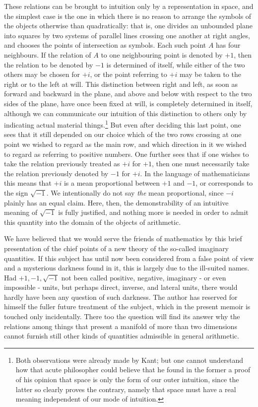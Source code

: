 \documentclass[12pt]{article}
\begin{document}
These relations can be brought to intuition only by a representation in space, and the simplest case is the one in which there is no reason to arrange the symbols of the objects otherwise than quadratically: that is, one divides an unbounded plane into squares by two systems of parallel lines crossing one another at right angles, and chooses the points of intersection as symbols. Each such point $A$ has four neighbours. If the relation of $A$ to one neighbouring point is denoted by $+1$, then the relation to be denoted by $-1$ is determined of itself, while either of the two others may be chosen for $+i$, or the point referring to $+i$ may be taken to the right or to the left at will. This distinction between right and left, as soon as forward and backward in the plane, and above and below with respect to the two sides of the plane, have once been fixed at will, is completely determined in itself, although we can communicate our intuition of this distinction to others only by indicating actual material things.\footnote{Both observations were already made by Kant; but one cannot understand how that acute philosopher could believe that he found in the former a proof of his opinion that space is only the form of our outer intuition, since the latter so clearly proves the contrary, namely that space must have a real meaning independent of our mode of intuition.} But even after deciding this last point, one sees that it still depended on our choice which of the two rows crossing at one point we wished to regard as the main row, and which direction in it we wished to regard as referring to positive numbers. One further sees that if one wishes to take the relation previously treated as $+i$ for $+1$, then one must necessarily take the relation previously denoted by $-1$ for $+i$. In the language of mathematicians this means that $+i$ is a mean proportional between $+1$ and $-1$, or corresponds to the sign $\sqrt{-1}$. We intentionally do not say \emph{the} mean proportional, since $-i$ plainly has an equal claim. Here, then, the demonstrability of an intuitive meaning of $\sqrt{-1}$ is fully justified, and nothing more is needed in order to admit this quantity into the domain of the objects of arithmetic.

We have believed that we would serve the friends of mathematics by this brief presentation of the chief points of a new theory of the so-called imaginary quantities. If this subject has until now been considered from a false point of view and a mysterious darkness found in it, this is largely due to the ill-suited names. Had $+1,-1,\sqrt{-1}$ not been called positive, negative, imaginary - or even impossible - units, but perhaps direct, inverse, and lateral units, there would hardly have been any question of such darkness. The author has reserved for himself the fuller future treatment of the subject, which in the present memoir is touched only incidentally. There too the question will find its answer why the relations among things that present a manifold of more than two dimensions cannot furnish still other kinds of quantities admissible in general arithmetic.
\end{document}
